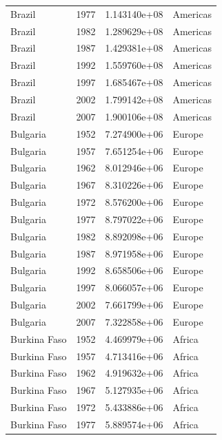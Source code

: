 \documentclass[
  letterpaper,
  DIV=11,
  numbers=noendperiod]{scrreprt}
\begin{document}
\begin{tcolorbox}
\begin{tabular}{lrrl}
Brazil                   &  1977 &  1.143140e+08 &  Americas \\
Brazil                   &  1982 &  1.289629e+08 &  Americas \\
Brazil                   &  1987 &  1.429381e+08 &  Americas \\
Brazil                   &  1992 &  1.559760e+08 &  Americas \\
Brazil                   &  1997 &  1.685467e+08 &  Americas \\
Brazil                   &  2002 &  1.799142e+08 &  Americas \\
Brazil                   &  2007 &  1.900106e+08 &  Americas \\
Bulgaria                 &  1952 &  7.274900e+06 &    Europe \\
Bulgaria                 &  1957 &  7.651254e+06 &    Europe \\
Bulgaria                 &  1962 &  8.012946e+06 &    Europe \\
Bulgaria                 &  1967 &  8.310226e+06 &    Europe \\
Bulgaria                 &  1972 &  8.576200e+06 &    Europe \\
Bulgaria                 &  1977 &  8.797022e+06 &    Europe \\
Bulgaria                 &  1982 &  8.892098e+06 &    Europe \\
Bulgaria                 &  1987 &  8.971958e+06 &    Europe \\
Bulgaria                 &  1992 &  8.658506e+06 &    Europe \\
Bulgaria                 &  1997 &  8.066057e+06 &    Europe \\
Bulgaria                 &  2002 &  7.661799e+06 &    Europe \\
Bulgaria                 &  2007 &  7.322858e+06 &    Europe \\
Burkina Faso             &  1952 &  4.469979e+06 &    Africa \\
Burkina Faso             &  1957 &  4.713416e+06 &    Africa \\
Burkina Faso             &  1962 &  4.919632e+06 &    Africa \\
Burkina Faso             &  1967 &  5.127935e+06 &    Africa \\
Burkina Faso             &  1972 &  5.433886e+06 &    Africa \\
Burkina Faso             &  1977 &  5.889574e+06 &    Africa \\

\end{tabular}
\end{tcolorbox}
\end{document}

